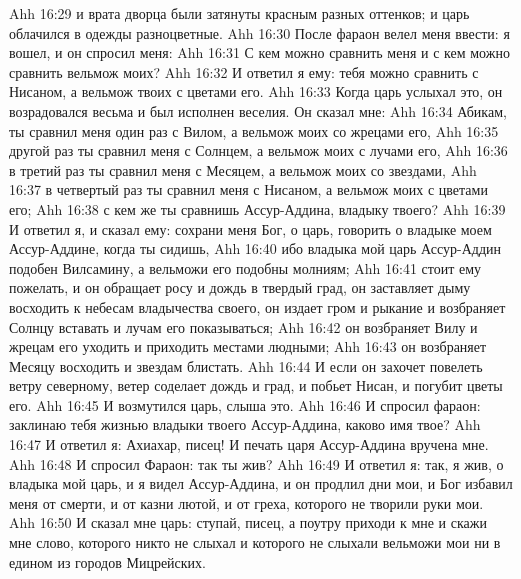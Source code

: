 \vs Ahh 16:29
и врата дворца были затянуты красным разных оттенков; и царь облачился в одежды разноцветные.
\vs Ahh 16:30
После фараон велел меня ввести: я вошел, и он спросил меня:
\vs Ahh 16:31
С кем можно сравнить меня и с кем можно сравнить вельмож моих?
\vs Ahh 16:32
И ответил я ему: тебя можно сравнить с Нисаном, а вельмож твоих с цветами его.
\vs Ahh 16:33
Когда царь услыхал это, он возрадовался весьма и был исполнен веселия. Он сказал мне:
\vs Ahh 16:34
Абикам, ты сравнил меня один раз с Вилом, а вельмож моих со жрецами его,
\vs Ahh 16:35
другой раз ты сравнил меня с Солнцем, а вельмож моих с лучами его,
\vs Ahh 16:36
в третий раз ты сравнил меня с Месяцем, а вельмож моих со звездами,
\vs Ahh 16:37
в четвертый раз ты сравнил меня с Нисаном, а вельмож моих с цветами его;
\vs Ahh 16:38
с кем же ты сравнишь Ассур-Аддина, владыку твоего?
\vs Ahh 16:39
И ответил я, и сказал ему: сохрани меня Бог, о царь, говорить о владыке моем Ассур-Аддине, когда ты сидишь,
\vs Ahh 16:40
ибо владыка мой царь Ассур-Аддин подобен Вилсамину, а вельможи его подобны молниям;
\vs Ahh 16:41
стоит ему пожелать, и он обращает росу и дождь в твердый град, он заставляет дыму восходить к небесам владычества своего, он издает гром и рыкание и возбраняет Солнцу вставать и лучам его показываться;
\vs Ahh 16:42
он возбраняет Вилу и жрецам его уходить и приходить местами людными;
\vs Ahh 16:43
он возбраняет Месяцу восходить и звездам блистать.
\vs Ahh 16:44
И если он захочет повелеть ветру северному, ветер соделает дождь и град, и побьет Нисан, и погубит цветы его.
\vs Ahh 16:45
И возмутился царь, слыша это.
\vs Ahh 16:46
И спросил фараон: заклинаю тебя жизнью владыки твоего Ассур-Аддина, каково имя твое?
\vs Ahh 16:47
И ответил я: Ахиахар, писец! И печать царя Ассур-Аддина вручена мне.
\vs Ahh 16:48
И спросил Фараон: так ты жив?
\vs Ahh 16:49
И ответил я: так, я жив, о владыка мой царь, и я видел Ассур-Аддина, и он продлил дни мои, и Бог избавил меня от смерти, и от казни лютой, и от греха, которого не творили руки мои.
\vs Ahh 16:50
И сказал мне царь: ступай, писец, а поутру приходи к мне и скажи мне слово, которого никто не слыхал и которого не слыхали вельможи мои ни в едином из городов Мицрейских.

